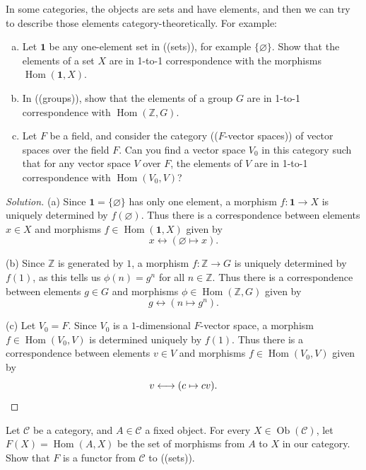 \documentclass[10pt]{article}
\providecommand{\ZZ}{\mathbb Z}
\providecommand{\ii}{\item}
\providecommand{\mb}[1]{\mathbf{#1}}
\newenvironment{soln}{\begin{proof}[Solution]}{\end{proof}}
\providecommand{\Ob}{\operatorname{Ob}}
\providecommand{\Hom}{\operatorname{Hom}}
\newcommand{\doubleparen}[1]{(\!(#1)\!)}
\begin{document}
\begin{problem}
    In some categories, the objects are sets and have elements,
    and then we can try to describe those elements category-theoretically.
    For example:
    \begin{enumerate}[(a)]
	\ii Let $\mathbf 1$ be any one-element set in \doubleparen{sets},
	for example $\{\varnothing\}$.
	Show that the elements of a set $X$ are in 1-to-1 correspondence
	with the morphisms $\Hom(\mathbf 1, X)$.
	\ii In \doubleparen{groups}, show that
	the elements of a group $G$ are in 1-to-1 correspondence
	with $\Hom(\ZZ,G)$.
	\ii Let $F$ be a field, and consider the category
	\doubleparen{$F$-vector spaces} of vector spaces
	over the field $F$. Can you find a vector space $V_0$ in this category
	such that for any vector space $V$ over $F$,
	the elements of $V$ are in 1-to-1 correspondence with $\Hom(V_0,V)$?
    \end{enumerate}
\end{problem}

\begin{soln}
    (a) Since $\mb 1 = \{\varnothing\}$ has only one element, a morphism
    $f\colon\mb 1\to X$ is uniquely determined by $f(\varnothing)$.
    Thus there is a correspondence between elements $x\in X$
    and morphisms $f\in\Hom(\mb 1,X)$ given by
    \begin{equation*}
        x \longleftrightarrow (\varnothing\mapsto x).
    \end{equation*}

    (b) Since $\ZZ$ is generated by $1$, a morphism
    $f\colon\ZZ\to G$ is uniquely determined by $f(1)$,
    as this tells us $\phi(n) = g^n$ for all $n\in\ZZ$.
    Thus there is a correspondence between elements $g\in G$
    and morphisms $\phi\in\Hom(\ZZ,G)$ given by
    \begin{equation*}
	g\longleftrightarrow (n\mapsto g^n).
    \end{equation*}

    (c) Let $V_0 = F$. Since $V_0$ is a $1$-dimensional $F$-vector space,
    a morphism $f\in\Hom(V_0,V)$ is determined uniquely by $f(1)$.
    Thus there is a correspondence between elements $v\in V$
    and morphisms $f\in\Hom(V_0,V)$ given by
    \begin{equation*}
        v\longleftrightarrow (c\mapsto cv).\qedhere
    \end{equation*}
\end{soln}

\begin{problem}
    Let $\mathscr C$ be a category, and $A\in\mathscr C$ a fixed object.
    For every $X\in\Ob(\mathscr C)$, let $F(X) = \Hom(A,X)$
    be the set of morphisms from $A$ to $X$ in our category.
    Show that $F$ is a functor from $\mathscr C$ to \doubleparen{sets}.
\end{problem}
\end{document}
